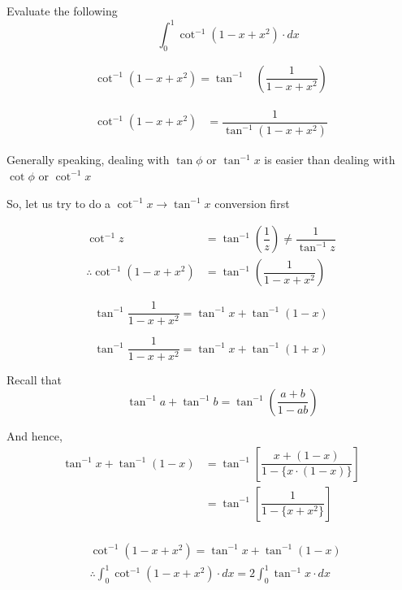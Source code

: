 \documentclass[14pt,fleqn]{extarticle}
\begin{document}
Evaluate the following \[ \qquad\quad \int_0^1 \cot^{-1}(1-x+x^2)\cdot dx \]
% 

\newcard 

\begin{align}
\cot^{-1}\left( 1-x+x^2\right) = \tan^{-1}&\left( \dfrac{1}{1-x+x^2}\right) 
\end{align}

\newcard 

\begin{align}
\cot^{-1}\left( 1-x+x^2\right) &= \dfrac{1}{\tan^{-1} \left( 1-x+x^2\right)}
\end{align}

\newcard 

Generally speaking, dealing with $\tan\phi$ or 
$\tan^{-1} x$ is easier than dealing with $\cot\phi$ 
or $\cot^{-1}x$\newline 

So, let us try to do a  
$\cot^{-1} x\rightarrow\tan^{-1}x$ conversion first

\begin{align}
	\cot^{-1} z &= \tan^{-1} \left(\dfrac{1}{z} \right)  \neq \dfrac{1}{\tan^{-1} z} \\
	\therefore \cot^{-1}\left( 1-x+x^2\right) &= \tan^{-1}\left( \dfrac{1}{1-x+x^2}\right)
\end{align}
 
\newcard 

\[ \tan^{-1}\dfrac{1}{1-x+x^2} = \tan^{-1} x + \tan^{-1} \left(1-x\right) \]

\newcard 

\[ \tan^{-1}\dfrac{1}{1-x+x^2} = \tan^{-1} x + \tan^{-1} \left(1+x\right) \]

\newcard 

Recall that \[\qquad\tan^{-1} a + \tan^{-1} b = \tan^{-1}\left(\frac{a + b}{1-ab}\right)\]

And hence, 
%
\begin{align}
\tan^{-1}x + \tan^{-1}(1-x) &= \tan^{-1}\left[ \dfrac{x + (1-x)}{1-\lbrace x\cdot(1-x)\rbrace}\right] \\
&= \tan^{-1}\left[ \dfrac{1}{1-\lbrace x + x^2\rbrace}\right] \\
\end{align}

\newcard 

\begin{align}
	&\cot^{-1} \left(1-x+x^2 \right) = \tan^{-1} x + \tan^{-1} \left(1-x \right) \\
	&\therefore \int_0^1 \cot^{-1} \left(1-x+x^2 \right)\cdot dx = 2\int_0^1 \tan^{-1} x\cdot dx 
\end{align}
\end{document}
